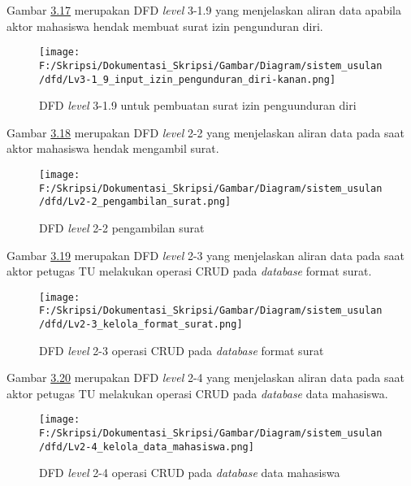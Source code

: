 Gambar \hyperlink{level_3-1.9}{3.17} merupakan DFD \textit{level} 3-1.9 yang menjelaskan aliran data apabila aktor mahasiswa hendak membuat surat izin pengunduran diri.
\begin{figure}[H]
	\centering
		\texttt{[image: F:/Skripsi/Dokumentasi\_Skripsi/Gambar/Diagram/sistem\_usulan/dfd/Lv3-1\_9\_input\_izin\_pengunduran\_diri-kanan.png]}
	\caption{DFD \textit{level} 3-1.9 untuk pembuatan surat izin penguunduran diri}
	\label{fig:level_3-1.9}
\end{figure}

Gambar \hyperlink{level_2-2}{3.18} merupakan DFD \textit{level} 2-2 yang menjelaskan aliran data pada saat aktor mahasiswa hendak mengambil surat.

\begin{figure}[H]
	\centering
		\texttt{[image: F:/Skripsi/Dokumentasi\_Skripsi/Gambar/Diagram/sistem\_usulan/dfd/Lv2-2\_pengambilan\_surat.png]}
	\caption{DFD \textit{level} 2-2 pengambilan surat}
	\label{fig:level_2-2}
\end{figure}

Gambar \hyperlink{level_2-3}{3.19} merupakan DFD \textit{level} 2-3 yang menjelaskan aliran data pada saat aktor petugas TU melakukan operasi CRUD pada \textit{database} format surat.

\begin{figure}[H]
	\centering
		\texttt{[image: F:/Skripsi/Dokumentasi\_Skripsi/Gambar/Diagram/sistem\_usulan/dfd/Lv2-3\_kelola\_format\_surat.png]}
	\caption{DFD \textit{level} 2-3 operasi CRUD pada \textit{database} format surat}
	\label{fig:level_2-3}
\end{figure}

Gambar \hyperlink{level_2-4}{3.20} merupakan DFD \textit{level} 2-4 yang menjelaskan aliran data pada saat aktor petugas TU melakukan operasi CRUD pada \textit{database} data mahasiswa.

\begin{figure}[H]
	\centering
		\texttt{[image: F:/Skripsi/Dokumentasi\_Skripsi/Gambar/Diagram/sistem\_usulan/dfd/Lv2-4\_kelola\_data\_mahasiswa.png]}
	\caption{DFD \textit{level} 2-4 operasi CRUD pada \textit{database} data mahasiswa}
	\label{fig:level_2-4}
\end{figure}


